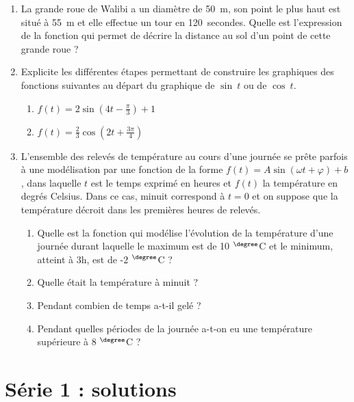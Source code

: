 \documentclass[a4paper,fontsize=13pt]{scrreprt}
\theoremstyle{plain}
\theoremstyle{definition}
\newenvironment{benumerate}[1][0pt]{\begin{enumerate}\renewcommand{\makelabel}[1]{\textbf{##1}}\setlength{\itemsep}{#1}}{\end{enumerate}}
\renewcommand{\d}{\displaystyle}
\begin{document}
\begin{benumerate}[14pt]
\item La grande roue de Walibi a un diamètre de 50~m, son point le plus haut est situé à 55~m et elle effectue un tour en 120~secondes. Quelle est l'expression de la fonction qui permet de décrire la distance au sol d'un point de cette grande roue ?

\item Explicite les différentes étapes permettant de construire les graphiques des fonctions suivantes au départ du graphique de $\sin~t$ ou de $\cos~t$.
\begin{benumerate}
\item $\d f(t)=2\sin\left(4t-\frac{\pi}{3}\right)+1$
\item $\d f(t)=\frac{2}{3}\cos\left(2t+\frac{3\pi}{4}\right)$
\end{benumerate}

\item L'ensemble des relevés de température au cours d'une journée se prête parfois à une modélisation par une fonction de la forme $f(t)=A\sin(\omega t + \varphi)+b$, dans laquelle $t$ est le temps exprimé en heures et $f(t)$ la température en degrés Celsius. Dans ce cas, minuit correspond à $t=0$ et on suppose que la température décroit dans les premières heures de relevés.
\begin{benumerate}
\item Quelle est la fonction qui modélise l'évolution de la température d'une journée durant laquelle le maximum est de 10 ${}^{\degree}$C et le minimum, atteint à 3h, est de -2 ${}^{\degree}$C ?
\item Quelle était la température à minuit ?
\item Pendant combien de temps a-t-il gelé ?
\item Pendant quelles périodes de la journée a-t-on eu une température supérieure à 8 ${}^{\degree}$C ?
\end{benumerate}

\end{benumerate}

\section{Série 1 : solutions}
\end{document}
